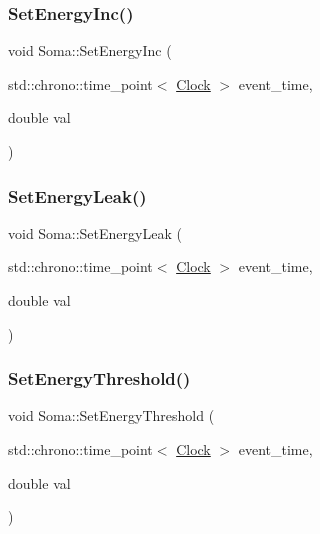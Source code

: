 \mbox{\label{classSoma_a414afd7eb780e29a432603198a9838ed}} 
\subsubsection{\texorpdfstring{Set\+Energy\+Inc()}{SetEnergyInc()}}
{\footnotesize\ttfamily void Soma\+::\+Set\+Energy\+Inc (\begin{DoxyParamCaption}\item[{std\+::chrono\+::time\+\_\+point$<$ \mbox{\hyperlink{universe_8h_a0ef8d951d1ca5ab3cfaf7ab4c7a6fd80}{Clock}} $>$}]{event\+\_\+time,  }\item[{double}]{val }\end{DoxyParamCaption})\hspace{0.3cm}{\ttfamily [inline]}}

\mbox{\label{classSoma_abca59a00940ca2d9c005a84b6785c12f}} 
\subsubsection{\texorpdfstring{Set\+Energy\+Leak()}{SetEnergyLeak()}}
{\footnotesize\ttfamily void Soma\+::\+Set\+Energy\+Leak (\begin{DoxyParamCaption}\item[{std\+::chrono\+::time\+\_\+point$<$ \mbox{\hyperlink{universe_8h_a0ef8d951d1ca5ab3cfaf7ab4c7a6fd80}{Clock}} $>$}]{event\+\_\+time,  }\item[{double}]{val }\end{DoxyParamCaption})\hspace{0.3cm}{\ttfamily [inline]}}

\mbox{\label{classSoma_ae2876b37909f37e8922ce364eb06491f}} 
\subsubsection{\texorpdfstring{Set\+Energy\+Threshold()}{SetEnergyThreshold()}}
{\footnotesize\ttfamily void Soma\+::\+Set\+Energy\+Threshold (\begin{DoxyParamCaption}\item[{std\+::chrono\+::time\+\_\+point$<$ \mbox{\hyperlink{universe_8h_a0ef8d951d1ca5ab3cfaf7ab4c7a6fd80}{Clock}} $>$}]{event\+\_\+time,  }\item[{double}]{val }\end{DoxyParamCaption})\hspace{0.3cm}{\ttfamily [inline]}}

